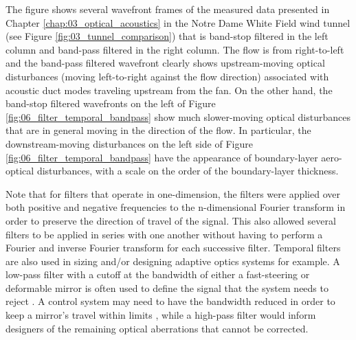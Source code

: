 The figure shows several wavefront frames of the measured data presented in Chapter \ref{chap:03_optical_acoustics} in the Notre Dame White Field wind tunnel (see Figure \ref{fig:03_tunnel_comparison}) that is band-stop filtered in the left column and band-pass filtered in the right column.
The flow is from right-to-left and the band-pass filtered wavefront clearly shows upstream-moving optical disturbances (moving left-to-right against the flow direction) associated with acoustic duct modes traveling upstream from the fan.
On the other hand, the band-stop filtered wavefronts on the left of Figure \ref{fig:06_filter_temporal_bandpass} show much slower-moving optical disturbances that are in general moving in the direction of the flow.
In particular, the downstream-moving disturbances on the left side of Figure \ref{fig:06_filter_temporal_bandpass} have the appearance of boundary-layer aero-optical disturbances, with a scale on the order of the boundary-layer thickness.

Note that for filters that operate in one-dimension, the filters were applied over both positive and negative frequencies to the n-dimensional Fourier transform in order to preserve the direction of travel of the signal.
This also allowed several filters to be applied in series with one another without having to perform a Fourier and inverse Fourier transform for each successive filter.
Temporal filters are also used in sizing and/or designing adaptive optics systems \cite{Greenwood-1977-aWDqUh6C} for example.
A low-pass filter with a cutoff at the bandwidth of either a fast-steering or deformable mirror is often used to define the signal that the system needs to reject \cite{Whiteley-2007-bHbWRWUu}.
A control system may need to have the bandwidth reduced in order to keep a mirror’s travel within limits \cite{Madec-2012-YJ8eWhPB}, while a high-pass filter would inform designers of the remaining optical aberrations that cannot be corrected.



